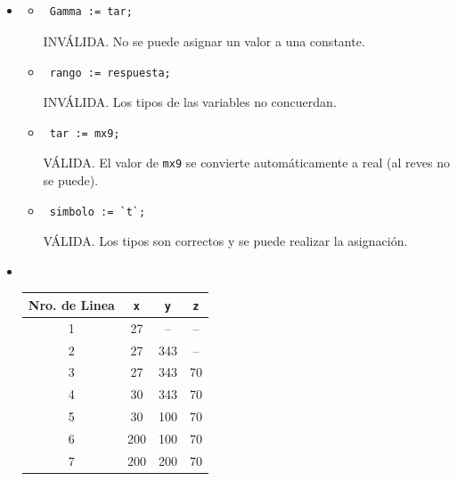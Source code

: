 \documentclass[a4paper,10pt]{article}
\begin{document}
~\\ \\ \\ \\
\begin{itemize}

\item[3]
    \begin{itemize}
        \item[d-] \begin{verbatim} Gamma := tar;\end{verbatim} INV\'ALIDA. No se puede asignar un valor a una constante.
        \item[e-] \begin{verbatim} rango := respuesta;\end{verbatim} INV\'ALIDA. Los tipos de las variables no concuerdan.
        \item[g-] \begin{verbatim} tar := mx9;\end{verbatim} V\'ALIDA. El valor de \verb=mx9= se convierte autom\'aticamente a real (al reves no se puede).  
        \item[h-] \begin{verbatim} simbolo := `t`;\end{verbatim} V\'ALIDA. Los tipos son correctos y se puede realizar la asignaci\'on.
    \end{itemize}

\item[4.b-] ~~
    \begin{table}[!h]
      \begin{tabular}{|c||c|c|c|}
        \hline
        Nro. de Linea & \verb=x= & \verb=y= & \verb=z= \\
        \hline \hline
        1 & 27 & -- & -- \\
        2 & 27 & 343 & -- \\
        3 & 27 & 343 & 70 \\
        4 & 30 & 343 & 70 \\
        5 & 30 & 100 & 70 \\
        6 & 200 & 100 & 70 \\
        7 & 200 & 200 & 70 \\
        \hline
      \end{tabular}
    \end{table}


\end{itemize}
\end{document}

